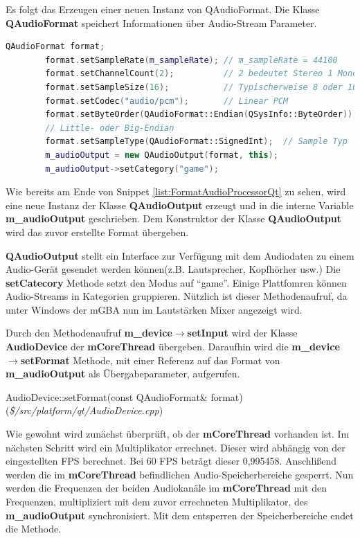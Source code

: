 \documentclass[11pt,a4paper]{scrartcl}
\begin{document}
Es folgt das Erzeugen einer neuen Instanz von QAudioFormat. Die Klasse \textbf{QAudioFormat} speichert Informationen \"uber Audio-Stream Parameter.

\vspace{5mm}
\begin{lstlisting}[language=C++, caption={Ausschnitt aus AudioProcessorQt::start()}, label={list:FormatAudioProcessorQt}]
    QAudioFormat format;
		format.setSampleRate(m_sampleRate); // m_sampleRate = 44100
		format.setChannelCount(2);			// 2 bedeutet Stereo 1 Mono
		format.setSampleSize(16);			// Typischerweise 8 oder 16
		format.setCodec("audio/pcm");		// Linear PCM
		format.setByteOrder(QAudioFormat::Endian(QSysInfo::ByteOrder));
		// Little- oder Big-Endian
		format.setSampleType(QAudioFormat::SignedInt);	// Sample Typ
		m_audioOutput = new QAudioOutput(format, this);
		m_audioOutput->setCategory("game");
\end{lstlisting}
  
Wie bereits am Ende von Snippet \ref{list:FormatAudioProcessorQt} zu sehen, wird eine neue Instanz der Klasse \textbf{QAudioOutput} erzeugt und in die interne Variable \textbf{m\_audioOutput} geschrieben. 
Dem Konstruktor der Klasse \textbf{QAudioOutput} wird das zuvor erstellte Format \"ubergeben.

\textbf{QAudioOutput} stellt ein Interface zur Verf\"ugung mit dem Audiodaten zu einem Audio-Ger\"at
gesendet werden k\"onnen(z.B. Lautsprecher, Kopfh\"orher usw.) Die \textbf{setCatecory} Methode setzt den Modus auf "`game"'. Einige Plattfomren k\"onnen Audio-Streams in Kategorien gruppieren.
N\"utzlich ist dieser Methodenaufruf, da unter Windows der mGBA nun im Lautst\"arken Mixer angezeigt wird.

Durch den Methodenaufruf \textbf{m\_device$\rightarrow$setInput} wird der Klasse \textbf{AudioDevice} der \textbf{mCoreThread} \"ubergeben. Daraufhin wird die \textbf{m\_device$\rightarrow$setFormat} Methode, mit einer Referenz auf
das Format von \textbf{m\_audioOutput} als \"Ubergabeparameter, aufgerufen.

\newpage

\vspace{5mm}
\large AudioDevice::setFormat(const QAudioFormat\& format) \normalsize(\textit{\$/src/platform/qt/AudioDevice.cpp})
\vspace{2mm}\newline
 
Wie gewohnt wird zun\"achst \"uberpr\"uft, ob der \textbf{mCoreThread} vorhanden ist. Im n\"achsten Schritt wird ein Multiplikator errechnet. Dieser wird abh\"angig von der eingestellten FPS berechnet. Bei 60 FPS betr\"agt dieser
0,995458. Anschli{\ss}end werden die im \textbf{mCoreThread} befindlichen Audio-Speicherbereiche gesperrt. Nun werden die Frequenzen der beiden Audiokan\"ale im \textbf{mCoreThread} mit den Frequenzen, multipliziert mit dem zuvor errechneten
Multiplikator, des \textbf{m\_audioOutput} synchronisiert. Mit dem entsperren der Speicherbereiche endet die Methode.
\end{document}
